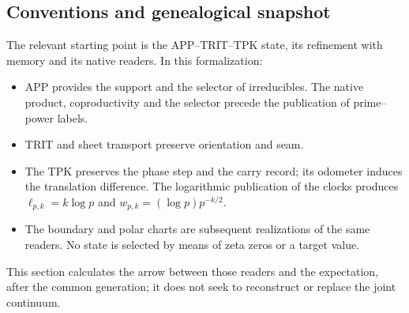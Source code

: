 \subsection{Conventions and genealogical snapshot}
\label{viii:gamma-add-sub-32}

The relevant starting point is the APP--TRIT--TPK state, its refinement with memory and its native readers. In this formalization:

\begin{itemize}
\item APP provides the support and the selector of irreducibles. The native product, coproductivity and the selector precede the publication of prime--power labels.
\item TRIT and sheet transport preserve orientation and seam.
\item The TPK preserves the phase step and the carry record; its odometer induces the translation difference. The logarithmic publication of the clocks produces \(\ell_{p,k}=k\log p\) and \(w_{p,k}=(\log p)p^{-k/2}\).
\item The boundary and polar charts are subsequent realizations of the same readers. No state is selected by means of zeta zeros or a target value.

\end{itemize}
This section calculates the arrow between those readers and the expectation, after the common generation; it does not seek to reconstruct or replace the joint continuum.

